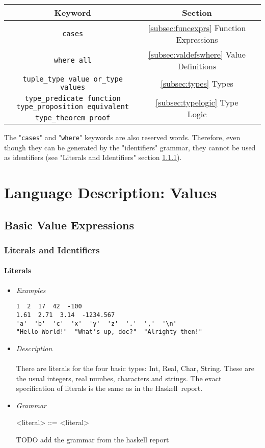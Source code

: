 \documentclass{article}
\def\H{Haskell}
\begin{document}
\begin{center}
\begin{tabular}{ |c|c|c| } 
\hline
Keyword & Section \\ 
\hline
\hline
\texttt{cases} & \ref{subsec:funcexprs} Function Expressions \\
\hline
\texttt{where all} & \ref{subsec:valdefswhere} Value Definitions \\
\hline
\texttt{tuple_type value or_type values} & \ref{subsec:types} Types \\
\hline
\texttt{type_predicate function type_proposition equivalent} &
  \multirow{2}{*}{\ref{subsec:typelogic} Type Logic} \\
\texttt{type_theorem proof} & \\
\hline
\end{tabular}
\end{center}
The "\texttt{cases}" and "\texttt{where}" keywords are also
reserved words. Therefore, even though they can be generated by the
"identifiers" grammar, they cannot be used as identifiers (see "Literals and
Identifiers" section \ref{subsubsec:litsandidents}).

\section{Language Description: Values}

\subsection{Basic Value Expressions}

\subsubsection{Literals and Identifiers}
\label{subsubsec:litsandidents}

\paragraph{Literals}
\begin{itemize}

\item \textit{Examples}
\begin{verbatim}
1  2  17  42  -100
1.61  2.71  3.14  -1234.567
'a'  'b'  'c'  'x'  'y'  'z'  '.'  ','  '\n'
"Hello World!"  "What's up, doc?"  "Alrighty then!"
\end{verbatim}

\item \textit{Description} \\\\
There are literals for the four basic types: Int, Real, Char, String. These are the 
usual integers, real numbes, characters and strings. The exact specification of 
literals is the same as in the \H\ report.

\item \textit{Grammar}
\begin{grammar}
<literal> ::= <literal>
\end{grammar}
TODO add the grammar from the haskell report

\end{itemize}
\end{document}

